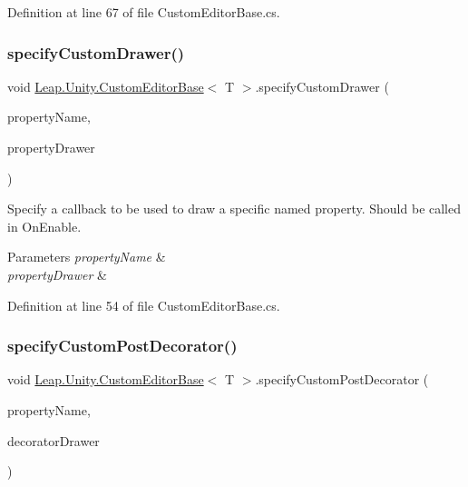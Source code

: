 Definition at line 67 of file Custom\+Editor\+Base.\+cs.

\mbox{\label{class_leap_1_1_unity_1_1_custom_editor_base_aab8bbda3edcc92a5c3d5a5360988c265}} 
\subsubsection{\texorpdfstring{specifyCustomDrawer()}{specifyCustomDrawer()}}
{\footnotesize\ttfamily void \mbox{\hyperlink{class_leap_1_1_unity_1_1_custom_editor_base}{Leap.\+Unity.\+Custom\+Editor\+Base}}$<$ T $>$.specify\+Custom\+Drawer (\begin{DoxyParamCaption}\item[{string}]{property\+Name,  }\item[{Action$<$ Serialized\+Property $>$}]{property\+Drawer }\end{DoxyParamCaption})\hspace{0.3cm}{\ttfamily [protected]}}



Specify a callback to be used to draw a specific named property. Should be called in On\+Enable. 


\begin{DoxyParams}{Parameters}
{\em property\+Name} & \\
\hline
{\em property\+Drawer} & \\
\hline
\end{DoxyParams}


Definition at line 54 of file Custom\+Editor\+Base.\+cs.

\mbox{\label{class_leap_1_1_unity_1_1_custom_editor_base_a9b40a6fa85eec234563632935f08e7e1}} 
\subsubsection{\texorpdfstring{specifyCustomPostDecorator()}{specifyCustomPostDecorator()}}
{\footnotesize\ttfamily void \mbox{\hyperlink{class_leap_1_1_unity_1_1_custom_editor_base}{Leap.\+Unity.\+Custom\+Editor\+Base}}$<$ T $>$.specify\+Custom\+Post\+Decorator (\begin{DoxyParamCaption}\item[{string}]{property\+Name,  }\item[{Action$<$ Serialized\+Property $>$}]{decorator\+Drawer }\end{DoxyParamCaption})\hspace{0.3cm}{\ttfamily [protected]}}



